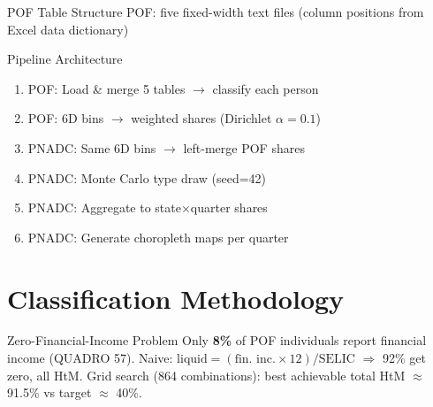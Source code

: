 \documentclass{beamer}
\begin{document}
\begin{frame}{POF Table Structure}
  POF: five fixed-width text files (column positions from Excel data dictionary)
  \begin{table}
    \tiny
  \end{table}
\end{frame}

\begin{frame}{Pipeline Architecture}
  \begin{enumerate}
    \item POF: Load \& merge 5 tables $\rightarrow$ classify each person
    \item POF: 6D bins $\rightarrow$ weighted shares (Dirichlet $\alpha=0.1$)
    \item PNADC: Same 6D bins $\rightarrow$ left-merge POF shares
    \item PNADC: Monte Carlo type draw (seed=42)
    \item PNADC: Aggregate to state$\times$quarter shares
    \item PNADC: Generate choropleth maps per quarter
  \end{enumerate}
\end{frame}

\section{Classification Methodology}

\begin{frame}{Zero-Financial-Income Problem}
  Only \textbf{8\%} of POF individuals report financial income (QUADRO 57).
  \vspace{0.5em}
  Naive: $\text{liquid} = (\text{fin.\ inc.} \times 12)/\text{SELIC}$ $\Rightarrow$ 92\% get zero, all HtM.
  \vspace{0.5em}
  Grid search (864 combinations): best achievable total HtM $\approx$ 91.5\% vs target $\approx$ 40\%.
\end{frame}
\end{document}
